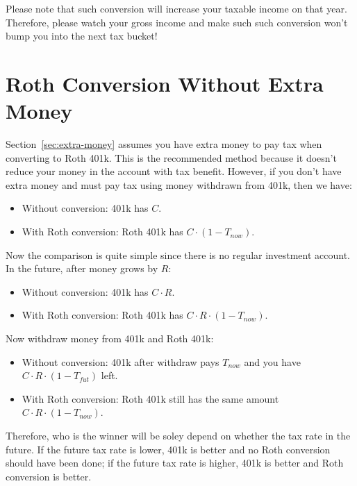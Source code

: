 \documentclass[twocolumn]{article}
\begin{document}
Please note that such conversion will increase your taxable income on that year. Therefore, please watch your gross income and make such such conversion won't bump you into the next tax bucket!

\section{Roth Conversion Without Extra Money}

Section~\ref{sec:extra-money} assumes you have extra money to pay tax when converting to Roth 401k. This is the recommended method because it doesn't reduce your money in the account with tax benefit. However, if you don't have extra money and must pay tax using money withdrawn from 401k, then we have:

\begin{itemize}
\item Without conversion: 401k has $C$.
\item With Roth conversion: Roth 401k has $C \cdot (1 - T_{now})$.
\end{itemize}

Now the comparison is quite simple since there is no regular investment account. In the future, after money grows by $R$:

\begin{itemize}
\item Without conversion: 401k has $C \cdot R$.
\item With Roth conversion: Roth 401k has $C \cdot R \cdot (1 - T_{now})$.
\end{itemize}

Now withdraw money from 401k and Roth 401k:

\begin{itemize}
\item Without conversion: 401k after withdraw pays $T_{now}$ and you have $C \cdot R \cdot (1 - T_{fut})$ left.
\item With Roth conversion: Roth 401k still has the same amount $C \cdot R \cdot (1 - T_{now})$.
\end{itemize}

Therefore, who is the winner will be soley depend on whether the tax rate in the future. If the future tax rate is lower, 401k is better and no Roth conversion should have been done; if the future tax rate is higher, 401k is better and Roth conversion is better.
\end{document}
